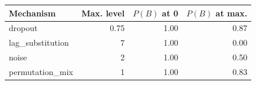 \begin{tabular}{lrrr}
\toprule
Mechanism & Max. level & $P(B)$ at 0 & $P(B)$ at max. \\
\midrule
dropout & 0.75 & 1.00 & 0.87 \\
lag\_substitution & 7 & 1.00 & 0.00 \\
noise & 2 & 1.00 & 0.50 \\
permutation\_mix & 1 & 1.00 & 0.83 \\
\bottomrule
\end{tabular}
